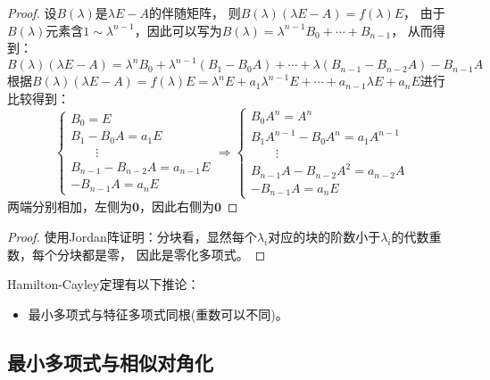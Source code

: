 \begin{proof}
  设$B(\lambda)$是$\lambda E - A$的伴随矩阵，
  则$B(\lambda)(\lambda E - A) = f(\lambda )E$，
  由于$B(\lambda)$元素含$1 \sim \lambda^{n-1}$，因此可以写为$B(\lambda) = \lambda^{n-1} B_0 + \cdots + B_{n-1}$，
  从而得到：
  \begin{equation*}
    B(\lambda)(\lambda E - A) = \lambda^n B_0 + \lambda^{n-1}(B_1 - B_0A) + \cdots + \lambda(B_{n-1} - B_{n-2}A) - B_{n-1}A
  \end{equation*}
  根据$B(\lambda)(\lambda E - A) = f(\lambda)E = \lambda^n E + a_1\lambda^{n-1}E + \cdots + a_{n-1}\lambda E + a_nE$进行比较得到：
  \begin{equation*}
    \begin{cases}
      B_0 = E\\
      B_1 - B_0A = a_1E\\
      \quad\quad \vdots\\
      B_{n-1}- B_{n-2}A = a_{n-1}E\\
      -B_{n-1}A = a_nE
    \end{cases}
    \Rightarrow
    \begin{cases}
      B_0A^n = A^n\\
      B_1A^{n-1} - B_0A^n = a_1A^{n-1}\\
      \quad \quad \vdots\\
      B_{n-1}A - B_{n-2}A^2 = a_{n-2}A\\
      -B_{n-1}A = a_nE
    \end{cases}
  \end{equation*}
  两端分别相加，左侧为$\mathbf{0}$，因此右侧为$\mathbf{0}$
\end{proof}

\begin{proof}
  使用Jordan阵证明：分块看，显然每个$\lambda_i$对应的块的阶数小于$\lambda_i$的代数重数，每个分块都是零，
  因此是零化多项式。
\end{proof}

\begin{corollary}
  Hamilton-Cayley定理有以下推论：
  \begin{itemize}
  \item  最小多项式与特征多项式同根(重数可以不同)。
  \end{itemize}
\end{corollary}

\subsection{最小多项式与相似对角化}

